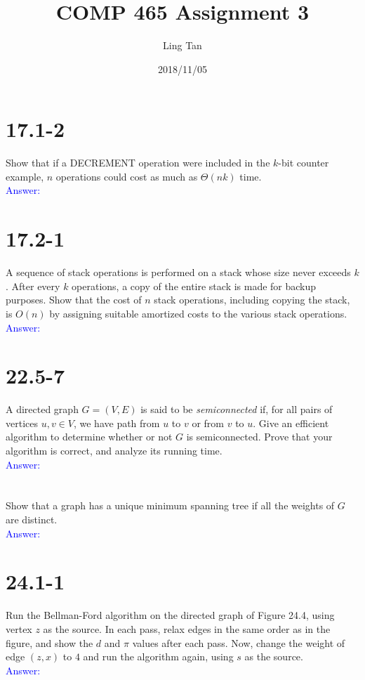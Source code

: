 \documentclass[a4paper]{article}
\title{COMP 465 Assignment 3}
\author{Ling Tan}
\date{2018/11/05}
\begin{document}
\maketitle

\section{17.1-2} Show that if a DECREMENT operation were included in the $k$-bit counter example, $n$ operations could cost as much as $\Theta(nk)$ time.\\
\textcolor{blue}{Answer:}

\section{17.2-1} A sequence of stack operations is performed on a stack whose size never exceeds $k$. After every $k$ operations, a copy of the entire stack is made for backup purposes. Show that the cost of $n$ stack operations, including copying the stack, is $O(n)$ by assigning suitable amortized costs to the various stack operations.\\
\textcolor{blue}{Answer:}

\section{22.5-7} A directed graph $ G= (V, E)$ is said to be \textit{semiconnected} if, for all pairs of vertices $u, v \in V$, we have path from $u$ to $v$ or from $v$ to $u$. Give an efficient algorithm to determine whether or not $G$ is semiconnected. Prove that your algorithm is correct, and analyze its running time.\\
\textcolor{blue}{Answer:}

\section{} Show that a graph has a unique minimum spanning tree if all the weights of $G$ are distinct.\\
\textcolor{blue}{Answer:}

\section{24.1-1} Run the Bellman-Ford algorithm on the directed graph of Figure 24.4, using vertex $z$ as the source. In each pass, relax edges in the same order as in the figure, and show the $d$ and $\pi$ values after each pass. Now, change the weight of edge $(z, x)$ to $4$ and run the algorithm again, using $s$ as the source.\\
\textcolor{blue}{Answer:}
\end{document}
